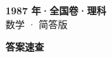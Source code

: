 \documentclass[zihao=-4, a4paper]{ctexart}
\begin{document}
\begin{center}
  {\Large\bfseries 1987 年·全国卷·理科}\\[4pt]
  {\large 数学 · 简答版}
\end{center}
\medskip
{}

\clearpage
{}
\begin{center}{\Large\bfseries 答案速查}\end{center}
\medskip

\end{document}
